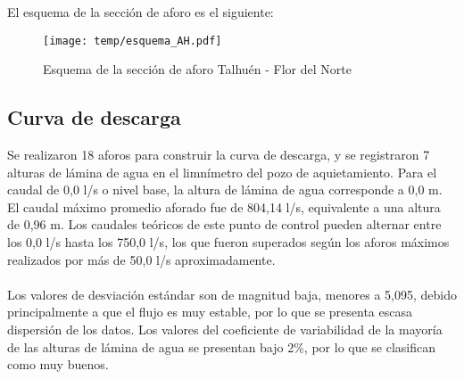 \documentclass[]{article}
\begin{document}
El esquema de la sección de aforo es el siguiente:

\begin{figure}[H]
  \centering
  \texttt{[image: temp/esquema\_AH.pdf]}
\caption{Esquema de la sección de aforo Talhuén - Flor del Norte}
\label{fig:Esquema_AH}
\end{figure}

\subsection{Curva de descarga}\label{curva-de-descarga-7}

Se realizaron 18 aforos para construir la curva de descarga, y se registraron 7 alturas de lámina de agua en el limnímetro del pozo de aquietamiento. Para el caudal de 0,0 l/s o nivel base, la altura de lámina de agua corresponde a 0,0 m. El caudal máximo promedio aforado fue de 804,14 l/s, equivalente a una altura de 0,96 m. Los caudales teóricos de este punto de control pueden alternar entre los 0,0 l/s hasta los 750,0 l/s, los que fueron superados según los aforos máximos realizados por más de 50,0 l/s aproximadamente.\\
\\
Los valores de desviación estándar son de magnitud baja, menores a 5,095,  debido principalmente a que el flujo es muy estable, por lo que se presenta escasa dispersión de los datos. Los valores del coeficiente de variabilidad de la mayoría de las alturas de lámina de agua se presentan bajo 2\%, por lo que se clasifican como muy buenos. 
\end{document}

